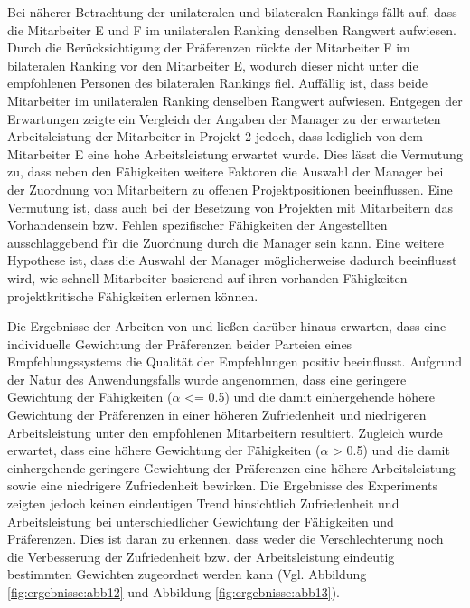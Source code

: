 Bei näherer Betrachtung der unilateralen und bilateralen Rankings fällt auf, dass die Mitarbeiter E und F im unilateralen Ranking denselben Rangwert aufwiesen.
Durch die Berücksichtigung der Präferenzen rückte der Mitarbeiter F im bilateralen Ranking vor den Mitarbeiter E, wodurch dieser nicht unter die empfohlenen Personen des bilateralen Rankings fiel.
Auffällig ist, dass beide Mitarbeiter im unilateralen Ranking denselben Rangwert aufwiesen.
Entgegen der Erwartungen zeigte ein Vergleich der Angaben der Manager zu der erwarteten Arbeitsleistung der Mitarbeiter in Projekt 2 jedoch, dass lediglich von dem Mitarbeiter E eine hohe Arbeitsleistung erwartet wurde.
Dies lässt die Vermutung zu, dass neben den Fähigkeiten weitere Faktoren die Auswahl der Manager bei der Zuordnung von Mitarbeitern zu offenen Projektpositionen beeinflussen.
Eine Vermutung ist, dass auch bei der Besetzung von Projekten mit Mitarbeitern das Vorhandensein bzw. Fehlen spezifischer Fähigkeiten der Angestellten ausschlaggebend für die Zuordnung durch die Manager sein kann.  
Eine weitere Hypothese ist, dass die Auswahl der Manager möglicherweise dadurch beeinflusst wird, wie schnell Mitarbeiter basierend auf ihren vorhanden Fähigkeiten projektkritische Fähigkeiten erlernen können.

Die Ergebnisse der Arbeiten von \textcite[S. 131ff.]{kleinerman:2:inproceedings} und \textcite[S. 4031 ff.]{neve:inproceedings} ließen darüber hinaus erwarten, dass eine individuelle Gewichtung der Präferenzen beider Parteien eines Empfehlungssystems die Qualität der Empfehlungen positiv beeinflusst.
Aufgrund der Natur des Anwendungsfalls wurde angenommen, dass eine geringere Gewichtung der Fähigkeiten ($\alpha$ <= 0.5) und die damit einhergehende höhere Gewichtung der Präferenzen in einer höheren Zufriedenheit und niedrigeren Arbeitsleistung unter den empfohlenen Mitarbeitern resultiert.
Zugleich wurde erwartet, dass eine höhere Gewichtung der Fähigkeiten ($\alpha$ > 0.5) und die damit einhergehende geringere Gewichtung der Präferenzen eine höhere Arbeitsleistung sowie eine niedrigere Zufriedenheit bewirken.
Die Ergebnisse des Experiments zeigten jedoch keinen eindeutigen Trend hinsichtlich Zufriedenheit und Arbeitsleistung bei unterschiedlicher Gewichtung der Fähigkeiten und Präferenzen.
Dies ist daran zu erkennen, dass weder die Verschlechterung noch die Verbesserung der Zufriedenheit bzw. der Arbeitsleistung eindeutig bestimmten Gewichten zugeordnet werden kann (Vgl. Abbildung \ref{fig:ergebnisse:abb12} und Abbildung \ref{fig:ergebnisse:abb13}).

